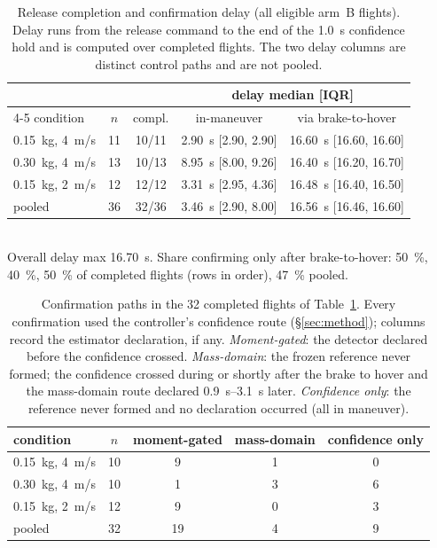 \begin{table}[tb]
\caption{Release completion and confirmation delay (all eligible arm~B flights). Delay runs
from the release command to the end of the \SI{1.0}{s} confidence hold and is computed over
completed flights. The two delay columns are distinct control paths and are not pooled.}
\label{tab:complete}
\centering
\scriptsize
\setlength{\tabcolsep}{3.5pt}
\begin{tabular}{@{}lcccc@{}}
\toprule
 & & & \multicolumn{2}{c}{delay median [IQR]} \\
\cmidrule(lr){4-5}
condition & $n$ & compl. & in-maneuver & via brake-to-hover \\
\midrule
\SI{0.15}{kg}, \SI{4}{m/s} & 11 & 10/11 & \SI{2.90}{s} [2.90, 2.90] & \SI{16.60}{s} [16.60, 16.60] \\
\SI{0.30}{kg}, \SI{4}{m/s} & 13 & 10/13 & \SI{8.95}{s} [8.00, 9.26] & \SI{16.40}{s} [16.20, 16.70] \\
\SI{0.15}{kg}, \SI{2}{m/s} & 12 & 12/12 & \SI{3.31}{s} [2.95, 4.36] & \SI{16.48}{s} [16.40, 16.50] \\
\midrule
pooled & 36 & 32/36 & \SI{3.46}{s} [2.90, 8.00] & \SI{16.56}{s} [16.46, 16.60] \\
\bottomrule
\end{tabular}
\\[2pt]
\footnotesize Overall delay max \SI{16.70}{s}. Share confirming only after brake-to-hover:
\SI{50}{\percent}, \SI{40}{\percent}, \SI{50}{\percent} of completed flights (rows in order),
\SI{47}{\percent} pooled.
\end{table}

\begin{table}[tb]
\caption{Confirmation paths in the 32 completed flights of Table~\ref{tab:complete}. Every confirmation
used the controller's confidence route (\S\ref{sec:method}); columns record the estimator
declaration, if any. \emph{Moment-gated}: the detector declared before the confidence crossed.
\emph{Mass-domain}: the frozen reference never formed; the confidence crossed during or shortly
after the brake to hover and the mass-domain route declared \SIrange{0.9}{3.1}{s} later.
\emph{Confidence only}: the reference never formed and no declaration occurred (all in
maneuver).}
\label{tab:paths}
\centering
\scriptsize
\setlength{\tabcolsep}{3.5pt}
\begin{tabular}{@{}lcccc@{}}
\toprule
condition & $n$ & moment-gated & mass-domain & confidence only \\
\midrule
\SI{0.15}{kg}, \SI{4}{m/s} & 10 & 9 & 1 & 0 \\
\SI{0.30}{kg}, \SI{4}{m/s} & 10 & 1 & 3 & 6 \\
\SI{0.15}{kg}, \SI{2}{m/s} & 12 & 9 & 0 & 3 \\
\midrule
pooled & 32 & 19 & 4 & 9 \\
\bottomrule
\end{tabular}
\end{table}

